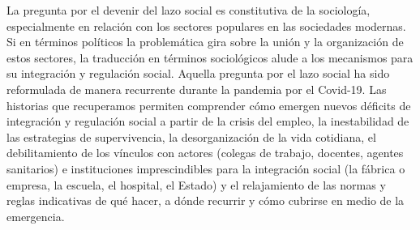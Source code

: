 \begin{refsection}
La pregunta por el devenir del lazo social es constitutiva de la sociología, especialmente en relación con los sectores populares en las sociedades modernas. Si en términos políticos la problemática gira sobre la unión y la organización de estos sectores, la traducción en términos sociológicos alude a los mecanismos para su integración y regulación social. Aquella pregunta por el lazo social ha sido reformulada de manera recurrente durante la pandemia por el Covid-19. Las historias que recuperamos permiten comprender cómo emergen nuevos déficits de integración y regulación social a partir de la crisis del empleo, la inestabilidad de las estrategias de supervivencia, la desorganización de la vida cotidiana, el debilitamiento de los vínculos con actores (colegas de trabajo, docentes, agentes sanitarios) e instituciones imprescindibles para la integración social (la fábrica o empresa, la escuela, el hospital, el Estado) y el relajamiento de las normas y reglas indicativas de qué hacer, a dónde recurrir y cómo cubrirse en medio de la emergencia.


\section*{\refname}
\printbibliography[heading=none]
\end{refsection}

